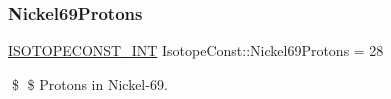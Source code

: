 \subsubsection{\texorpdfstring{Nickel69\+Protons}{Nickel69Protons}}
{\footnotesize\ttfamily \mbox{\hyperlink{group___isotope_const-_macros_ga5f18360b3e99483a35c32d789e62621c}{I\+S\+O\+T\+O\+P\+E\+C\+O\+N\+S\+T\+\_\+\+I\+NT}} Isotope\+Const\+::\+Nickel69\+Protons = 28}

\$ \$ Protons in Nickel-\/69. 
